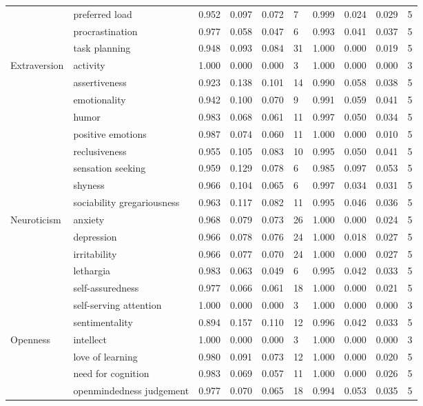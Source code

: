 \documentclass[,man,floatsintext]{apa6}
\theoremstyle{definition}
\theoremstyle{definition}
\theoremstyle{definition}
\theoremstyle{remark}
\begin{document}
\begin{table}[H]
{\begin{tabular}{llllllllll}
 & preferred load & 0.952 & 0.097 & 0.072 & 7 & 0.999 & 0.024 & 0.029 & 5\\
 & procrastination & 0.977 & 0.058 & 0.047 & 6 & 0.993 & 0.041 & 0.037 & 5\\
 & task planning & 0.948 & 0.093 & 0.084 & 31 & 1.000 & 0.000 & 0.019 & 5\\
Extraversion & activity & 1.000 & 0.000 & 0.000 & 3 & 1.000 & 0.000 & 0.000 & 3\\
 & assertiveness & 0.923 & 0.138 & 0.101 & 14 & 0.990 & 0.058 & 0.038 & 5\\
 & emotionality & 0.942 & 0.100 & 0.070 & 9 & 0.991 & 0.059 & 0.041 & 5\\
 & humor & 0.983 & 0.068 & 0.061 & 11 & 0.997 & 0.050 & 0.034 & 5\\
 & positive emotions & 0.987 & 0.074 & 0.060 & 11 & 1.000 & 0.000 & 0.010 & 5\\
 & reclusiveness & 0.955 & 0.105 & 0.083 & 10 & 0.995 & 0.050 & 0.041 & 5\\
 & sensation seeking & 0.959 & 0.129 & 0.078 & 6 & 0.985 & 0.097 & 0.053 & 5\\
 & shyness & 0.966 & 0.104 & 0.065 & 6 & 0.997 & 0.034 & 0.031 & 5\\
 & sociability gregariousness & 0.963 & 0.117 & 0.082 & 11 & 0.995 & 0.046 & 0.036 & 5\\
Neuroticism & anxiety & 0.968 & 0.079 & 0.073 & 26 & 1.000 & 0.000 & 0.024 & 5\\
 & depression & 0.966 & 0.078 & 0.076 & 24 & 1.000 & 0.018 & 0.027 & 5\\
 & irritability & 0.966 & 0.077 & 0.070 & 24 & 1.000 & 0.000 & 0.027 & 5\\
 & lethargia & 0.983 & 0.063 & 0.049 & 6 & 0.995 & 0.042 & 0.033 & 5\\
 & self-assuredness & 0.977 & 0.066 & 0.061 & 18 & 1.000 & 0.000 & 0.021 & 5\\
 & self-serving attention & 1.000 & 0.000 & 0.000 & 3 & 1.000 & 0.000 & 0.000 & 3\\
 & sentimentality & 0.894 & 0.157 & 0.110 & 12 & 0.996 & 0.042 & 0.033 & 5\\
Openness & intellect & 1.000 & 0.000 & 0.000 & 3 & 1.000 & 0.000 & 0.000 & 3\\
 & love of learning & 0.980 & 0.091 & 0.073 & 12 & 1.000 & 0.000 & 0.020 & 5\\
 & need for cognition & 0.983 & 0.069 & 0.057 & 11 & 1.000 & 0.000 & 0.026 & 5\\
 & openmindedness judgement & 0.977 & 0.070 & 0.065 & 18 & 0.994 & 0.053 & 0.035 & 5\\

\end{tabular}}
\end{table}
\end{document}
